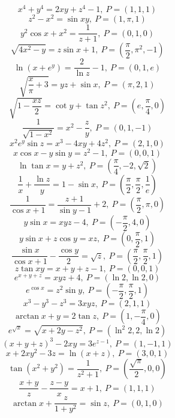 \[ x^4 + y^4 = 2xy + z^4 - 1, ~ P = \left( 1, 1, 1 \right) \]
\[ z^2 - x^2 = \sin{xy}, ~ P = \left( 1, \pi, 1 \right) \]
\[ y^2 \cos{x} + x^2 = \frac{1}{z+1}, ~ P = \left( 0, 1, 0 \right) \]
\[ \sqrt{4x^2 - y} = z\sin{x} + 1, ~ P = \left( \frac{\pi}{2}, \pi^2, -1 \right) \]
\[ \ln\left( x + e^{y} \right) = \frac{2}{\ln{z}} - 1, ~ P = \left( 0, 1, e \right) \]
\[ \sqrt{\frac{x}{\pi} + 3} = yz + \sin{x}, ~ P = \left( \pi, 2, 1 \right) \]
\[ \sqrt{1 - \frac{xz}{2}} = \cot{y} + \tan{z^2}, ~ P = \left( e, \frac{\pi}{4}, 0 \right) \]
\[ \frac{1}{\sqrt{1 - x^2}} = x^2 - \frac{z}{y}, ~ P = \left( 0, 1, -1 \right) \]
\[ x^2 e^y \sin{z} = x^3 - 4xy + 4z^2, ~ P = \left( 2, 1, 0 \right) \]
\[ x \cos{x} - y \sin{y} = z^2 - 1, ~ P = \left( 0, 0, 1 \right) \]
\[ \ln{\tan{x}} = y + z^2, ~ P = \left( \frac{\pi}{4}, -2, \sqrt{2} \right) \]
\[ \frac{1}{x} + \frac{\ln{z}}{y} = 1 - \sin{x}, ~ P = \left( \frac{\pi}{2}, \frac{\pi}{2}, \frac{1}{e} \right) \]
\[ \frac{1}{\cos{x} + 1} = \frac{z + 1}{\sin{y} - 1} + 2, ~ P = \left( \frac{\pi}{2}, \pi, 0 \right) \]
\[ y\sin{x} = xyz - 4, ~ P = \left( -\frac{\pi}{2}, 4, 0 \right) \]
\[ y\sin{x} + z\cos{y} = xz, ~ P = \left( 0, \frac{\pi}{2}, 1 \right) \]
\[ \frac{\sin{x}}{\cos{x} + 1} - \frac{\cos{y}}{2} = \sqrt{z}, ~ P = \left( \frac{\pi}{2}, \frac{\pi}{2}, 1 \right) \]
\[ z\tan{xy} = x + y + z - 1, ~ P = \left( 0, 0, 1 \right) \]
\[ e^{x+y+z} = xyz + 4, ~ P = \left( \ln{2}, \ln{2}, 0 \right) \]
\[ e^{\cos{x}} = z^2\sin{y}, ~ P = \left( -\frac{\pi}{2}, \frac{\pi}{2}, 1 \right) \]
\[ x^3 - y^3 - z^3 = 3xyz, ~ P = \left( 2, 1, 1 \right) \]
\[ \arctan{x} + y = 2\tan{z}, ~ P = \left( 1, -\frac{\pi}{4}, 0 \right) \]
\[ e^{\sqrt{x}} = \sqrt{x + 2y - z^2}, ~ P = \left( \ln^2 {2}, 2, \ln{2} \right) \]
\[ (x + y + z)^3 - 2xy = 3e^{z-1}, ~ P = \left( 1, -1, 1 \right) \]
\[ x + 2xy^2 - 3z = \ln(x+z), ~ P = \left( 3, 0, 1 \right) \]
\[ \tan\left( x^2 + y^2 \right) = \frac{1}{z^2+1}, ~ P = \left( \frac{\sqrt{\pi}}{2}, 0, 0 \right) \]
\[ \frac{x+y}{z} - \frac{z-y}{x} = x+1, ~ P = \left( 1, 1, 1 \right) \]
\[ \arctan{x} + \frac{z}{1+y^2} = \sin{z}, ~ P = \left( 0, 1, 0 \right) \]